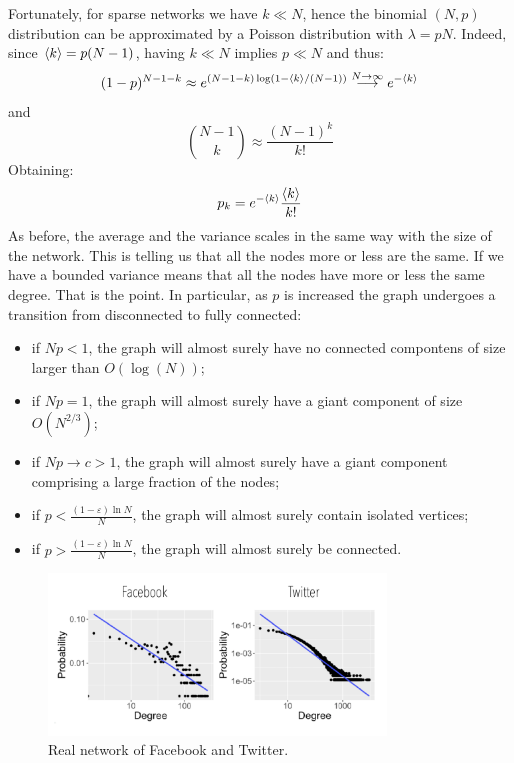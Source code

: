 \documentclass[../main/main.tex]{subfiles}
\begin{document}
Fortunately, for sparse networks we have \( k \ll N \), hence the binomial \( (N,p) \) distribution can be approximated by a Poisson distribution with \( \lambda = p N \). Indeed, since  \( \expval{k} = p(N-1)  \), having \( k \ll N \) implies \( p \ll N \) and thus:
\begin{equation*}
  (1-p)^{N-1-k} \approx e^{(N-1-k) \log (1- \expval{k}/(N-1) )} \overset{N \rightarrow \infty }{\longrightarrow } e^{- \expval{k} }
\end{equation*}
and
\begin{equation*}
  \binom{N-1}{k} \approx \frac{(N-1)^k}{k!}
\end{equation*}
Obtaining:
\begin{equation}
  p_k = e^{- \expval{k} } \frac{\expval{k} }{k!}
\end{equation}
As before, the average and the variance scales in the same way with the size of the network. This is telling us that all the nodes more or less are the same. If we have a bounded variance means that all the nodes have more or less the same degree. That is the point.
In particular, as $p$ is increased the graph undergoes a transition from disconnected to fully connected:
\begin{itemize}
\item if \( N p < 1 \), the graph will almost surely have no connected compontens of size larger than \( O(\log(N)) \);
\item if \( N p = 1 \), the graph will almost surely have a giant component of size \( O(N^{2/3}) \);
\item if \( N p \rightarrow c > 1 \), the graph will almost surely have a giant component comprising a large fraction of the nodes;
\item if \( p < \frac{(1- \varepsilon )\ln N}{N} \), the graph will almost surely contain isolated vertices;
\item if \( p > \frac{(1- \varepsilon )\ln N}{N} \),  the graph will almost surely be connected.
\end{itemize}

\begin{figure}[h!]
\centering
\includegraphics[width=0.8\textwidth]{../lessons/image/07/4.png}
\caption{\label{fig:07_4} Real network of Facebook and Twitter.}
\end{figure}
\end{document}
